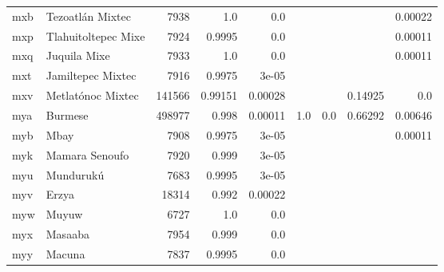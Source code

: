 \documentclass[11pt]{article}
\begin{document}
\begin{table*}[h]
{\begin{tabular}{llrrrrrrr}
mxb         & Tezoatlán Mixtec         & 7938         & 1.0         & 0.0         &          &          &          & 0.00022         \\

mxp         & Tlahuitoltepec Mixe         & 7924         & 0.9995         & 0.0         &          &          &          & 0.00011         \\

mxq         & Juquila Mixe         & 7933         & 1.0         & 0.0         &          &          &          & 0.00011         \\

mxt         & Jamiltepec Mixtec         & 7916         & 0.9975         & 3e-05         &          &          &          &          \\

mxv         & Metlatónoc Mixtec         & 141566         & 0.99151         & 0.00028         &          &          & 0.14925         & 0.0         \\

mya         & Burmese         & 498977         & 0.998         & 0.00011         & 1.0         & 0.0         & 0.66292         & 0.00646         \\

myb         & Mbay         & 7908         & 0.9975         & 3e-05         &          &          &          & 0.00011         \\

myk         & Mamara Senoufo         & 7920         & 0.999         & 3e-05         &          &          &          &          \\

myu         & Mundurukú         & 7683         & 0.9995         & 3e-05         &          &          &          &          \\

myv         & Erzya         & 18314         & 0.992         & 0.00022         &          &          &          &          \\

myw         & Muyuw         & 6727         & 1.0         & 0.0         &          &          &          &          \\

myx         & Masaaba         & 7954         & 0.999         & 0.0         &          &          &          &          \\

myy         & Macuna         & 7837         & 0.9995         & 0.0         &          &          &          &          \\


\end{tabular}}
\end{table*}
\end{document}
